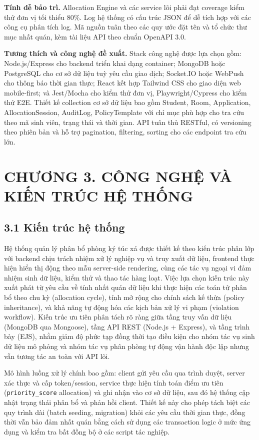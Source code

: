 \documentclass[a4paper,12pt,openany,oneside]{report}
\begin{document}
\textbf{Tính dễ bảo trì.} Allocation Engine và các service lõi phải đạt coverage
kiểm thử đơn vị tối thiểu 80\%. Log hệ thống có cấu trúc JSON để dễ tích hợp
với các công cụ phân tích log. Mã nguồn tuân theo các quy ước đặt tên và tổ chức
thư mục nhất quán, kèm tài liệu API theo chuẩn OpenAPI 3.0.

\textbf{Tương thích và công nghệ đề xuất.} Stack công nghệ được lựa chọn gồm:
Node.js/Express cho backend triển khai dạng container; MongoDB hoặc PostgreSQL
cho cơ sở dữ liệu tuỳ yêu cầu giao dịch; Socket.IO hoặc WebPush cho thông báo
thời gian thực; React kết hợp Tailwind CSS cho giao diện web mobile-first; và
Jest/Mocha cho kiểm thử đơn vị, Playwright/Cypress cho kiểm thử E2E. Thiết kế
collection cơ sở dữ liệu bao gồm Student, Room, Application, AllocationSession,
AuditLog, PolicyTemplate với chỉ mục phù hợp cho tra cứu theo mã sinh viên,
trạng thái và thời gian. API tuân thủ RESTful, có versioning theo phiên bản và
hỗ trợ pagination, filtering, sorting cho các endpoint tra cứu lớn.

\chapter*{CHƯƠNG 3. CÔNG NGHỆ VÀ KIẾN TRÚC HỆ THỐNG}

\section*{3.1 Kiến trúc hệ thống}
Hệ thống quản lý phân bổ phòng ký túc xá được thiết kế theo kiến trúc phân lớp với backend chịu trách nhiệm xử lý nghiệp vụ và truy xuất dữ liệu, frontend thực hiện hiển thị động theo mẫu server-side rendering, cùng các tác vụ ngoại vi đảm nhiệm sinh dữ liệu, kiểm thử và thao tác hàng loạt. Việc lựa chọn kiến trúc này xuất phát từ yêu cầu về tính nhất quán dữ liệu khi thực hiện các toán tử phân bổ theo chu kỳ (allocation cycle), tính mở rộng cho chính sách kế thừa (policy inheritance), và khả năng tự động hóa các kịch bản xử lý vi phạm (violation workflow). Kiến trúc ưu tiên phân tách rõ ràng giữa tầng truy vấn dữ liệu (MongoDB qua Mongoose), tầng API REST (Node.js + Express), và tầng trình bày (EJS), nhằm giảm độ phức tạp đồng thời tạo điều kiện cho nhóm tác vụ sinh dữ liệu mô phỏng và nhóm tác vụ phân phòng tự động vận hành độc lập nhưng vẫn tương tác an toàn với API lõi.

Mô hình luồng xử lý chính bao gồm: client gửi yêu cầu qua trình duyệt, server xác thực và cấp token/session, service thực hiện tính toán điểm ưu tiên (\texttt{priority\_score} allocation) và ghi nhận vào cơ sở dữ liệu, sau đó hệ thống cập nhật trạng thái phân bổ và phản hồi client. Thiết kế này cho phép tách biệt các quy trình dài (batch seeding, migration) khỏi các yêu cầu thời gian thực, đồng thời vẫn bảo đảm nhất quán bằng cách sử dụng các transaction logic ở mức ứng dụng và kiểm tra bất đồng bộ ở các script tác nghiệp.
\end{document}
